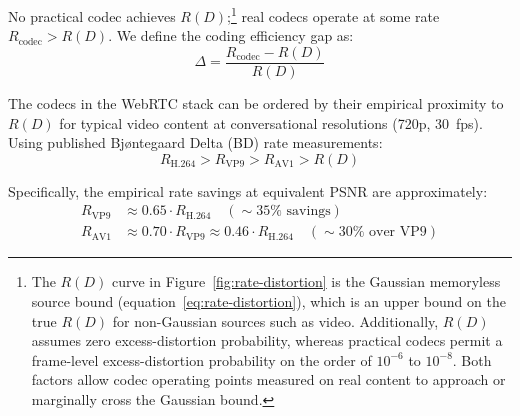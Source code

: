 No practical codec achieves $R(D)$;\footnote{The $R(D)$ curve in
Figure~\ref{fig:rate-distortion} is the Gaussian memoryless source bound
(equation~\ref{eq:rate-distortion}), which is an upper bound on the true
$R(D)$ for non-Gaussian sources such as video.  Additionally, $R(D)$ assumes
zero excess-distortion probability, whereas practical codecs permit a
frame-level excess-distortion probability on the order of $10^{-6}$ to
$10^{-8}$.  Both factors allow codec operating points measured on real content
to approach or marginally cross the Gaussian bound.} real codecs operate at
some rate $R_{\text{codec}} > R(D)$. We define the coding efficiency gap as:
\begin{equation}
  \Delta = \frac{R_{\text{codec}} - R(D)}{R(D)}
  \label{eq:coding-gap}
\end{equation}

The codecs in the WebRTC stack can be ordered by their empirical
proximity to $R(D)$ for typical video content at conversational
resolutions (720p, 30~fps). Using published Bj\o ntegaard Delta (BD)
rate measurements:
\begin{equation}
  R_{\text{H.264}} > R_{\text{VP9}} > R_{\text{AV1}}
    > R(D)
  \label{eq:codec-ordering}
\end{equation}

Specifically, the empirical rate savings at equivalent PSNR are
approximately:
\begin{align}
  R_{\text{VP9}}  &\approx 0.65 \cdot R_{\text{H.264}}
    \quad (\sim\!35\% \text{ savings}) \label{eq:vp9-savings} \\
  R_{\text{AV1}}  &\approx 0.70 \cdot R_{\text{VP9}}
    \approx 0.46 \cdot R_{\text{H.264}}
    \quad (\sim\!30\% \text{ over VP9})
  \label{eq:av1-savings}
\end{align}

